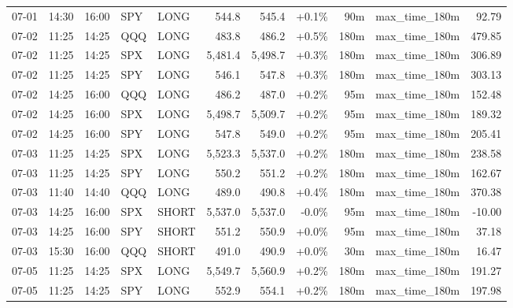 \documentclass[11pt,a4paper,twoside]{article}
\begin{document}
\begin{center}
\begin{longtable}{>{\color{txtmain}}l l l l l r r r r >{\color{txtmain}}l r}
07-01 & 14:30 & 16:00 & SPY & LONG & 544.8 & 545.4 & \textcolor{wingreen}{+0.1\%} & 90m & max\_time\_180m & \textcolor{wingreen}{92.79} \\
07-02 & 11:25 & 14:25 & QQQ & LONG & 483.8 & 486.2 & \textcolor{wingreen}{+0.5\%} & 180m & max\_time\_180m & \textcolor{wingreen}{479.85} \\
07-02 & 11:25 & 14:25 & SPX & LONG & 5,481.4 & 5,498.7 & \textcolor{wingreen}{+0.3\%} & 180m & max\_time\_180m & \textcolor{wingreen}{306.89} \\
07-02 & 11:25 & 14:25 & SPY & LONG & 546.1 & 547.8 & \textcolor{wingreen}{+0.3\%} & 180m & max\_time\_180m & \textcolor{wingreen}{303.13} \\
07-02 & 14:25 & 16:00 & QQQ & LONG & 486.2 & 487.0 & \textcolor{wingreen}{+0.2\%} & 95m & max\_time\_180m & \textcolor{wingreen}{152.48} \\
07-02 & 14:25 & 16:00 & SPX & LONG & 5,498.7 & 5,509.7 & \textcolor{wingreen}{+0.2\%} & 95m & max\_time\_180m & \textcolor{wingreen}{189.32} \\
07-02 & 14:25 & 16:00 & SPY & LONG & 547.8 & 549.0 & \textcolor{wingreen}{+0.2\%} & 95m & max\_time\_180m & \textcolor{wingreen}{205.41} \\
07-03 & 11:25 & 14:25 & SPX & LONG & 5,523.3 & 5,537.0 & \textcolor{wingreen}{+0.2\%} & 180m & max\_time\_180m & \textcolor{wingreen}{238.58} \\
07-03 & 11:25 & 14:25 & SPY & LONG & 550.2 & 551.2 & \textcolor{wingreen}{+0.2\%} & 180m & max\_time\_180m & \textcolor{wingreen}{162.67} \\
07-03 & 11:40 & 14:40 & QQQ & LONG & 489.0 & 490.8 & \textcolor{wingreen}{+0.4\%} & 180m & max\_time\_180m & \textcolor{wingreen}{370.38} \\
07-03 & 14:25 & 16:00 & SPX & SHORT & 5,537.0 & 5,537.0 & \textcolor{wingreen}{-0.0\%} & 95m & max\_time\_180m & \textcolor{lossred}{-10.00} \\
07-03 & 14:25 & 16:00 & SPY & SHORT & 551.2 & 550.9 & \textcolor{wingreen}{+0.0\%} & 95m & max\_time\_180m & \textcolor{wingreen}{37.18} \\
07-03 & 15:30 & 16:00 & QQQ & SHORT & 491.0 & 490.9 & \textcolor{wingreen}{+0.0\%} & 30m & max\_time\_180m & \textcolor{wingreen}{16.47} \\
07-05 & 11:25 & 14:25 & SPX & LONG & 5,549.7 & 5,560.9 & \textcolor{wingreen}{+0.2\%} & 180m & max\_time\_180m & \textcolor{wingreen}{191.27} \\
07-05 & 11:25 & 14:25 & SPY & LONG & 552.9 & 554.1 & \textcolor{wingreen}{+0.2\%} & 180m & max\_time\_180m & \textcolor{wingreen}{197.98} \\

\end{longtable}
\end{center}
\end{document}
